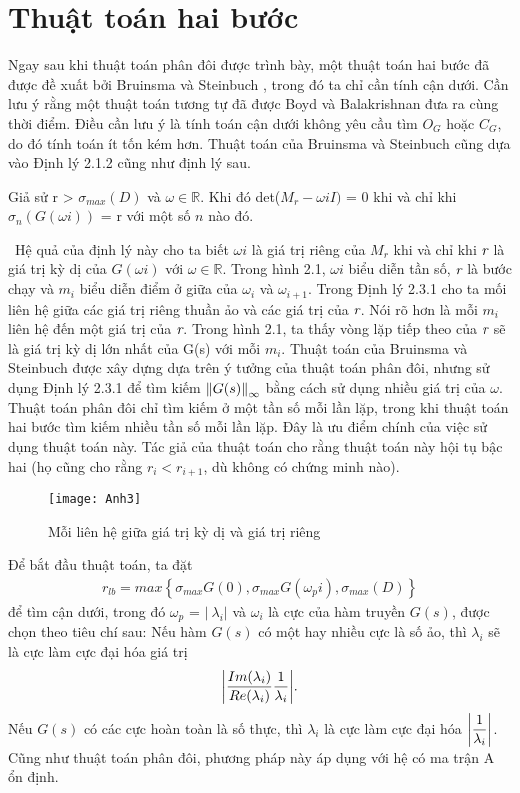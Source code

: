 \section{Thuật toán hai bước}
Ngay sau khi thuật toán phân đôi được trình bày, một thuật toán hai bước đã được đề xuất bởi Bruinsma và Steinbuch \cite{4}, trong đó ta chỉ cần tính cận dưới. Cần lưu ý rằng một thuật toán tương tự đã được Boyd và Balakrishnan \cite{3} đưa ra cùng thời điểm. Điều cần lưu ý là tính toán cận dưới không yêu cầu tìm $O_G$ hoặc $C_G$, do đó tính toán ít tốn kém hơn. Thuật toán của Bruinsma và Steinbuch cũng dựa vào Định lý 2.1.2 cũng như định lý sau.
\begin{theorem}\label{dly3.3.1}
Giả sử r > $\sigma_{max}(D)$ và $\omega \in \mathbb{R}$. Khi đó det($M_r - \omega iI)$ = 0 khi và chỉ khi $\sigma_{n}(G(\omega i))$ = r với một số $n$ nào đó.
\end{theorem}\
Hệ quả của định lý này cho ta biết $\omega i$ là giá trị riêng của $M_r$ khi và chỉ khi  $\emph{r}$ là giá trị kỳ dị của $G(\omega i)$ với $\omega \in \mathbb{R}$. Trong hình 2.1, $\omega i$ biểu diễn tần số, $\emph{r}$ là bước chạy và $m_i$ biểu diễn điểm ở giữa của $\omega_i$ và $\omega_{i+1}$. Trong Định lý 2.3.1 cho ta mối liên hệ giữa các giá trị riêng thuần ảo và các giá trị của $\emph{r}$. Nói rõ hơn là mỗi $m_i$ liên hệ đến một giá trị của $\emph{r}$. Trong hình 2.1, ta thấy vòng lặp tiếp theo của $\emph{r}$ sẽ là giá trị kỳ dị lớn nhất của G(s) với mỗi $m_i$.
\newline
Thuật toán của Bruinsma và Steinbuch được xây dựng dựa trên ý tưởng của thuật toán phân đôi, nhưng sử dụng Định lý 2.3.1 để tìm kiếm $\norm{G(s)}_\infty$ bằng cách sử dụng nhiều giá trị của $\omega$. Thuật toán phân đôi chỉ tìm kiếm ở một tần số mỗi lần lặp, trong khi thuật toán hai bước tìm kiếm nhiều tần số mỗi lần lặp. Đây là ưu điểm chính của việc sử dụng thuật toán này. Tác giả của thuật toán cho rằng thuật toán này hội tụ bậc hai (họ cũng cho rằng $r_i < r_{i+1}$, dù không có chứng minh nào).
\bigskip
\begin{figure}[htp]
\centering
  \texttt{[image: Anh3]}
  \caption{Mỗi liên hệ giữa giá trị kỳ dị và giá trị riêng}
  \label{fig:pic3}
\end{figure}

Để bắt đầu thuật toán, ta đặt
\begin{align}\label{ct3.3.1}
    r_{lb} = max \left\{\sigma_{max}G(0), \sigma_{max}G(\omega_{p}i), \sigma_{max}(D)\right\}
\end{align}
để tìm cận dưới, trong đó $\omega_{p}$ = $\vert\ \lambda_{i}\vert$ và $\omega_{i}$ là cực của hàm truyền $G(s)$, được chọn theo tiêu chí sau:
\newline
Nếu hàm $G(s)$ có một hay nhiều cực là số ảo, thì $\lambda_i$ sẽ là cực làm cực đại hóa giá trị
\begin{align}\label{ct3.3.2}
    \abs{\frac{Im(\lambda_{i})}{Re(\lambda_{i})} \dfrac{1}{\lambda_{i}}}.
\end{align}
Nếu $G(s)$ có các cực hoàn toàn là số thực, thì $\lambda_{i}$ là cực làm cực đại hóa $\abs{\dfrac{1}{\lambda_{i}}}$.\\
Cũng như thuật toán phân đôi, phương pháp này áp dụng với hệ có ma trận A ổn định.

